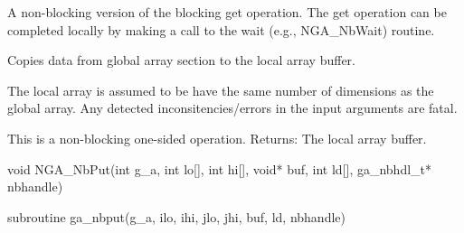 \documentclass[12pt]{article}
\begin{document}
\begin{desc}

A non-blocking version of the blocking get operation. The get operation can be completed locally by making a call to the wait (e.g., NGA_NbWait) routine.

Copies data from global array section to the local array buffer.

The local array is assumed to be have the same number of dimensions as the global array. Any detected inconsitencies/errors in the input arguments are fatal.

This is a non-blocking one-sided operation.
Returns: 
The local array buffer. 

\end{desc}


\begin{capi}
\begin{ccode}
void NGA_NbPut(int g_a, int lo[], int hi[], void* buf, int ld[], 
ga_nbhdl_t* nbhandle)
\end{ccode}
\begin{funcargs}
\end{funcargs}
\end{capi}

\begin{f2dapi}
\begin{fcode}
subroutine ga_nbput(g_a, ilo, ihi, jlo, jhi, buf, ld, nbhandle)
\end{fcode}
\begin{funcargs}
\end{funcargs}
\end{f2dapi}
\end{document}
